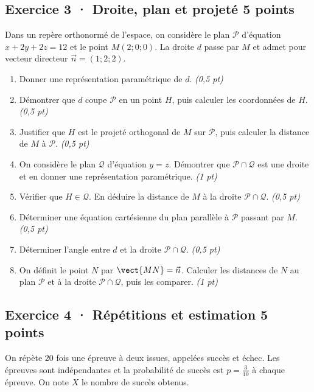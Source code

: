 \subsection*{Exercice 3 · Droite, plan et projeté \hfill 5 points}Dans un repère orthonormé de l'espace, on considère le plan $\mathcal P$ d'équation $x+2y+2z=12$ et le point $M(2;0;0)$. La droite $d$ passe par $M$ et admet pour vecteur directeur $\vec n=(1;2;2)$.

\begin{enumerate}

\item Donner une représentation paramétrique de $d$. \hfill\textit{(0,5 pt)}

\item Démontrer que $d$ coupe $\mathcal P$ en un point $H$, puis calculer les coordonnées de $H$. \hfill\textit{(0,5 pt)}

\item Justifier que $H$ est le projeté orthogonal de $M$ sur $\mathcal P$, puis calculer la distance de $M$ à $\mathcal P$. \hfill\textit{(0,5 pt)}

\item On considère le plan $\mathcal Q$ d'équation $y=z$. Démontrer que $\mathcal P\cap\mathcal Q$ est une droite et en donner une représentation paramétrique. \hfill\textit{(1 pt)}

\item Vérifier que $H\in\mathcal Q$. En déduire la distance de $M$ à la droite $\mathcal P\cap\mathcal Q$. \hfill\textit{(0,5 pt)}

\item Déterminer une équation cartésienne du plan parallèle à $\mathcal P$ passant par $M$. \hfill\textit{(0,5 pt)}

\item Déterminer l'angle entre $d$ et la droite $\mathcal P\cap\mathcal Q$. \hfill\textit{(0,5 pt)}

\item On définit le point $N$ par $\vect{MN}=\vec n$. Calculer les distances de $N$ au plan $\mathcal P$ et à la droite $\mathcal P\cap\mathcal Q$, puis les comparer. \hfill\textit{(1 pt)}

\end{enumerate}

\subsection*{Exercice 4 · Répétitions et estimation \hfill 5 points}On répète $20$ fois une épreuve à deux issues, appelées succès et échec. Les épreuves sont indépendantes et la probabilité de succès est $p=\frac{3}{10}$ à chaque épreuve. On note $X$ le nombre de succès obtenus.

